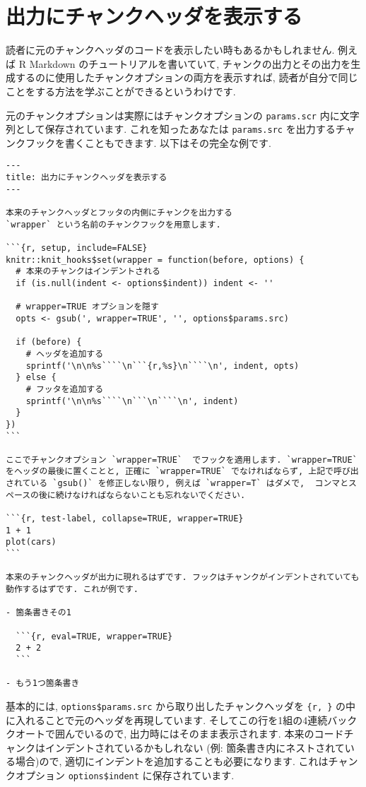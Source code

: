 \documentclass[
  11pt,
  lualatex,ja=standard,jafont=noto]{bxjsreport}
\begin{document}
\hypertarget{show-header}{%
\section{出力にチャンクヘッダを表示する}\label{show-header}}

読者に元のチャンクヘッダのコードを表示したい時もあるかもしれません. 例えば R Markdown のチュートリアルを書いていて, チャンクの出力とその出力を生成するのに使用したチャンクオプションの両方を表示すれば, 読者が自分で同じことをする方法を学ぶことができるというわけです.

元のチャンクオプションは実際にはチャンクオプションの \texttt{params.scr} 内に文字列として保存されています. これを知ったあなたは \texttt{params.src} を出力するチャンクフックを書くこともできます. 以下はその完全な例です.

\begin{verbatim}
---
title: 出力にチャンクヘッダを表示する
---

本来のチャンクヘッダとフッタの内側にチャンクを出力する
`wrapper` という名前のチャンクフックを用意します.

```{r, setup, include=FALSE}
knitr::knit_hooks$set(wrapper = function(before, options) {
  # 本来のチャンクはインデントされる
  if (is.null(indent <- options$indent)) indent <- ''
  
  # wrapper=TRUE オプションを隠す
  opts <- gsub(', wrapper=TRUE', '', options$params.src)
  
  if (before) {
    # ヘッダを追加する
    sprintf('\n\n%s````\n```{r,%s}\n````\n', indent, opts)
  } else {
    # フッタを追加する
    sprintf('\n\n%s````\n```\n````\n', indent)
  }
})
```

ここでチャンクオプション `wrapper=TRUE`  でフックを適用します. `wrapper=TRUE` をヘッダの最後に置くことと, 正確に `wrapper=TRUE` でなければならず, 上記で呼び出されている `gsub()` を修正しない限り, 例えば `wrapper=T` はダメで,  コンマとスペースの後に続けなければならないことも忘れないでください.

```{r, test-label, collapse=TRUE, wrapper=TRUE}
1 + 1
plot(cars)
```

本来のチャンクヘッダが出力に現れるはずです. フックはチャンクがインデントされていても動作するはずです. これが例です.

- 箇条書きその1

  ```{r, eval=TRUE, wrapper=TRUE}
  2 + 2
  ```

- もう1つ箇条書き
\end{verbatim}

基本的には, \texttt{options\$params.src} から取り出したチャンクヘッダを \texttt{\textasciigrave{}\textasciigrave{}\textasciigrave{}\{r,\ \}} の中に入れることで元のヘッダを再現しています. そしてこの行を1組の4連続バッククオートで囲んでいるので, 出力時にはそのまま表示されます. 本来のコードチャンクはインデントされているかもしれない (例: 箇条書き内にネストされている場合)ので, 適切にインデントを追加することも必要になります. これはチャンクオプション \texttt{options\$indent} に保存されています.
\end{document}
